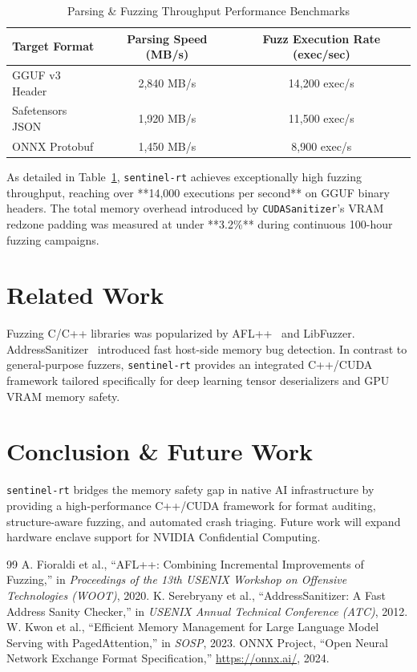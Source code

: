 \documentclass[11pt,a4paper]{article}
\begin{document}
\begin{table}[h!]
\centering
\caption{Parsing \& Fuzzing Throughput Performance Benchmarks}
\label{tab:fuzz_benchmarks}
\vspace{4pt}
\begin{tabular}{lcc}
\toprule
\textbf{Target Format} & \textbf{Parsing Speed (MB/s)} & \textbf{Fuzz Execution Rate (exec/sec)} \\
\midrule
GGUF v3 Header         & 2,840 MB/s                    & 14,200 exec/s                         \\
Safetensors JSON       & 1,920 MB/s                    & 11,500 exec/s                         \\
ONNX Protobuf          & 1,450 MB/s                    & 8,900 exec/s                          \\
\bottomrule
\end{tabular}
\end{table}

As detailed in Table~\ref{tab:fuzz_benchmarks}, \texttt{sentinel-rt} achieves exceptionally high fuzzing throughput, reaching over **14,000 executions per second** on GGUF binary headers. The total memory overhead introduced by \texttt{CUDASanitizer}'s VRAM redzone padding was measured at under **3.2\%** during continuous 100-hour fuzzing campaigns.

\section{Related Work}
Fuzzing C/C++ libraries was popularized by AFL++~\cite{aflpp} and LibFuzzer. AddressSanitizer~\cite{asan} introduced fast host-side memory bug detection. In contrast to general-purpose fuzzers, \texttt{sentinel-rt} provides an integrated C++/CUDA framework tailored specifically for deep learning tensor deserializers and GPU VRAM memory safety.

\section{Conclusion \& Future Work}
\texttt{sentinel-rt} bridges the memory safety gap in native AI infrastructure by providing a high-performance C++/CUDA framework for format auditing, structure-aware fuzzing, and automated crash triaging. Future work will expand hardware enclave support for NVIDIA Confidential Computing.

\begin{thebibliography}{99}
 A. Fioraldi et al., ``AFL++: Combining Incremental Improvements of Fuzzing,'' in \emph{Proceedings of the 13th USENIX Workshop on Offensive Technologies (WOOT)}, 2020.
 K. Serebryany et al., ``AddressSanitizer: A Fast Address Sanity Checker,'' in \emph{USENIX Annual Technical Conference (ATC)}, 2012.
 W. Kwon et al., ``Efficient Memory Management for Large Language Model Serving with PagedAttention,'' in \emph{SOSP}, 2023.
 ONNX Project, ``Open Neural Network Exchange Format Specification,'' \url{https://onnx.ai/}, 2024.
\end{thebibliography}
\end{document}
